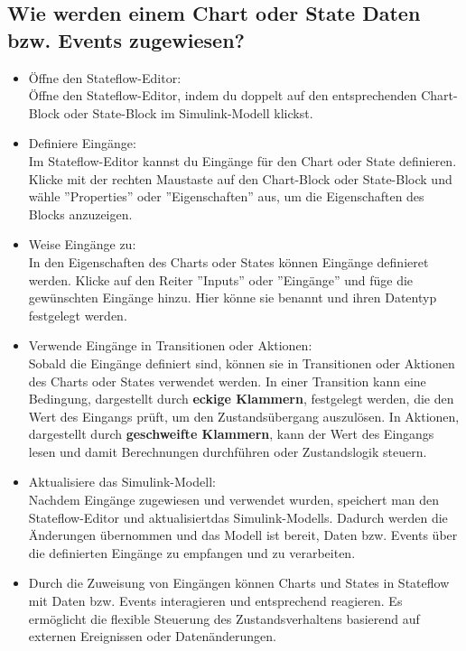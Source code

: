 \documentclass{article}
\begin{document}
\begin{multicols}{2}
		\subsection{Wie werden einem Chart oder State Daten bzw. Events zugewiesen?}
			\begin{itemize}
				\item Öffne den Stateflow-Editor: \\Öffne den Stateflow-Editor, indem du doppelt auf den entsprechenden Chart-Block oder State-Block im Simulink-Modell klickst.
				\item Definiere Eingänge: \\Im Stateflow-Editor kannst du Eingänge für den Chart oder State definieren. Klicke mit der rechten Maustaste auf den Chart-Block oder State-Block und wähle ''Properties'' oder ''Eigenschaften'' aus, um die Eigenschaften des Blocks anzuzeigen.
				\item Weise Eingänge zu: \\In den Eigenschaften des Charts oder States können Eingänge definieret werden. Klicke auf den Reiter ''Inputs'' oder ''Eingänge'' und füge die gewünschten Eingänge hinzu. Hier könne sie benannt und ihren Datentyp festgelegt werden.
				\item Verwende Eingänge in Transitionen oder Aktionen: \\Sobald die Eingänge definiert sind, können sie in Transitionen oder Aktionen des Charts oder States verwendet werden. In einer Transition kann eine Bedingung, dargestellt durch \textbf{eckige Klammern}, festgelegt werden, die den Wert des Eingangs prüft, um den Zustandsübergang auszulösen. In Aktionen, dargestellt durch \textbf{geschweifte Klammern}, kann der Wert des Eingangs lesen und damit Berechnungen durchführen oder Zustandslogik steuern.
				\item Aktualisiere das Simulink-Modell: \\Nachdem Eingänge zugewiesen und verwendet wurden, speichert man den Stateflow-Editor und aktualisiertdas Simulink-Modells. Dadurch werden die Änderungen übernommen und das Modell ist bereit, Daten bzw. Events über die definierten Eingänge zu empfangen und zu verarbeiten.
				\item Durch die Zuweisung von Eingängen können Charts und States in Stateflow mit Daten bzw. Events interagieren und entsprechend reagieren. Es ermöglicht die flexible Steuerung des Zustandsverhaltens basierend auf externen Ereignissen oder Datenänderungen.
			\end{itemize}

\end{multicols}
\end{document}
